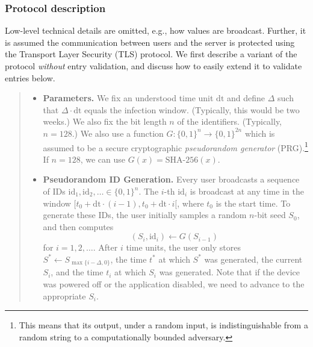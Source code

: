 \subsubsection{Protocol description} 

Low-level technical details are omitted, e.g., how values are broadcast. Further, it is assumed the communication between users and the server is protected using the Transport Layer Security (TLS)  protocol. We first describe a variant of the protocol {\em without} entry validation, and discuss how to easily extend it to validate entries below.


\newcommand{\id}{\mathrm{id}}
\newcommand{\dt}{\mathrm{dt}}

\begin{quote}
\begin{itemize}
    \item {\bf Parameters.} We fix an understood time unit $\dt$ and define $\Delta$ such that $\Delta \cdot \dt$ equals the infection window. (Typically, this would be two weeks.) We also fix the bit length $n$ of the identifiers. (Typically, $n = 128$.) We also use a function $G: \{0,1\}^n \to \{0,1\}^{2n}$ which is assumed to be a secure cryptographic {\em pseudorandom generator} (PRG).\footnote{This means that its output, under a random input, is indistinguishable from a random string to a computationally bounded adversary.} If $n = 128$, we can use $G(x) = \textrm{SHA-256}(x)$.
    \item {\bf Pseudorandom ID Generation.} Every user broadcasts a sequence of IDs $\id_1, \id_2, \ldots \in \{0,1\}^n$.  The $i$-th $\id_i$ is broadcast at any time in the window $[t_0 + \dt\cdot (i-1), t_0 + \dt\cdot i[$, where $t_0$ is the start time. To generate these IDs, the user initially samples a random $n$-bit seed $S_0$, and then computes
\begin{displaymath}
(S_i, \id_i) \gets G(S_{i-1}) \;
\end{displaymath}
for $i = 1,2, \ldots$.
After $i$ time units, the user only stores $S^* \gets S_{\max\{i-\Delta,0\}}$, the time $t^*$ at which $S^*$ was generated, the current $S_i$, and the time $t_i$ at which $S_i$ was generated. Note that if the device was powered off or the application disabled, we need to advance to the appropriate $S_i$. 


\end{itemize}
\end{quote}
